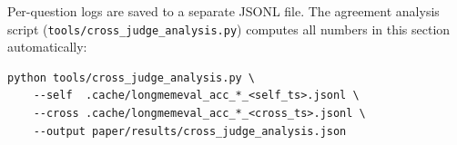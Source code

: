Per-question logs are saved to a separate JSONL file. The agreement
analysis script (\texttt{tools/cross\_judge\_analysis.py}) computes
all numbers in this section automatically:

\begin{verbatim}
python tools/cross_judge_analysis.py \
    --self  .cache/longmemeval_acc_*_<self_ts>.jsonl \
    --cross .cache/longmemeval_acc_*_<cross_ts>.jsonl \
    --output paper/results/cross_judge_analysis.json
\end{verbatim}
